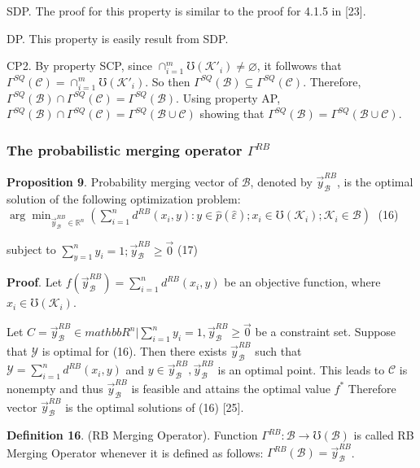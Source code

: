 \documentclass[]{iosart2c}
\begin{document}
SDP. The proof for this property is similar to the proof for 4.1.5 in [23].

DP. This property is easily result from SDP. 

CP2. By property SCP, since $\cap^m_{i=1}\mho(\mathcal{K}'_i) \neq \varnothing$,
it follwows that $\Gamma^{SQ}(\mathcal{C}) = \cap^m_{i=1}\mho(\mathcal{K}'_i)$. So then
$\Gamma^{SQ}(\mathcal{B}) \subseteq \Gamma^{SQ}(\mathcal{C})$. Therefore, $\Gamma^{SQ}(\mathcal{B}) \cap \Gamma^{SQ}(\mathcal{C}) =
\Gamma^{SQ}(\mathcal{B})$. Using property AP, $\Gamma^{SQ}(\mathcal{B}) \cap \Gamma^{SQ}(\mathcal{C}) = \Gamma^{SQ}(\mathcal{B} \cup \mathcal{C})$
showing that $\Gamma^{SQ}(\mathcal{B}) = \Gamma^{SQ}(\mathcal{B} \cup \mathcal{C})$.

\subsubsection{The probabilistic merging operator $\Gamma ^{RB}$}
\textbf{Proposition 9}. Probability merging vector of $\mathcal{B}$,
denoted by $\vec{y}^{RB}_\mathcal{B}$, is the optimal solution of the following optimization problem:
$\arg \min_{\vec{y}^{RB}_\mathcal{B} \in \mathbb{R}^n} \left( \sum^n_{i=1} d^{RB}(x_i, y) :
y \in \hat{p}(\hat{\varepsilon}); x_i \in \mho(\mathcal{K}_i);\mathcal{K}_i \in \mathcal{B} \right)$ (16)

subject to $\sum^n_{y=1} y_i= 1; \vec{y}^{RB}_\mathcal{B} \geq \vec{0}$ (17)

\textbf{Proof}. Let $f(\vec{y}^{RB}_\mathcal{B}) = \sum^n_{i=1} d^{RB}(x_i,y)$ be an objective function, where $x_i \in \mho(\mathcal{K}_i)$.

Let $C = { \vec{y}^{RB}_\mathcal{B} \in mathbb{R}^n|\sum^n_{i=1} y_i = 1, \vec{y}^{RB}_\mathcal{B} \geq \vec{0} }$ be
a constraint set. Suppose that $\mathcal{Y}$ is optimal for (16).
Then there exists $\vec{y}^{RB}_\mathcal{B}$ such that $\mathcal{Y} = \sum^n_{i=1} d^{RB}(x_i, y)$
and $y \in \vec{y}^{RB}_\mathcal{B} , \vec{y}^{RB}_\mathcal{B}$ is an optimal point. This leads to $\mathcal{C}$
is nonempty and thus $\vec{y}^{RB}_\mathcal{B}$ is feasible and attains the
optimal value $f^*$ Therefore vector $\vec{y}^{RB}_\mathcal{B}$ is the optimal
solutions of (16) [25].

\textbf{Definition 16}. (RB Merging Operator). Function 
$\Gamma^{RB} : \mathcal{B} \to \mho(\mathcal{B})$ is called RB Merging Operator
whenever it is defined as follows: $\Gamma^{RB}(\mathcal{B}) = \vec{y}^{RB}_\mathcal{B}$.
\end{document}
